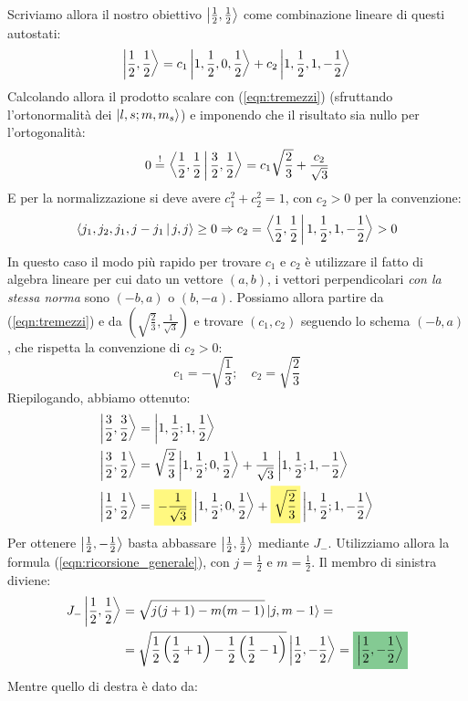 \documentclass[../../FisicaTeorica.tex]{subfiles}
\begin{document}
\begin{enumerate}
Scriviamo allora il nostro obiettivo $\Ket{\frac{1}{2},\frac{1}{2}}$ come combinazione lineare di questi autostati:
\[
\Ket{\frac{1}{2},\frac{1}{2}}=c_1\Ket{1,\frac{1}{2},0,\frac{1}{2}}+c_2\Ket{1,\frac{1}{2},1,-\frac{1}{2}}
\]
Calcolando allora il prodotto scalare con (\ref{eqn:tremezzi}) (sfruttando l'ortonormalità dei $\Ket{l,s;m,m_s}$) e imponendo che il risultato sia nullo per l'ortogonalità:
\begin{align*}
0 \overset{!}{=} \Braket{\frac{1}{2},\frac{1}{2}|\frac{3}{2},\frac{1}{2}}
= c_1 \sqrt{\frac{2}{3}}+\frac{c_2}{\sqrt{3}}
\end{align*}
E per la normalizzazione si deve avere $c_1^2 + c_2^2 =1$, con $c_2>0$ per la convenzione:
\[
\Braket{j_1, j_2, j_1, j-j_1 | j, j} \geq 0 \Rightarrow c_2 = \Braket{\frac{1}{2},\frac{1}{2}|1,\frac{1}{2},1,-\frac{1}{2}} > 0
\]
In questo caso il modo più rapido per trovare $c_1$ e $c_2$ è utilizzare il fatto di algebra lineare per cui dato un vettore $(a, b)$, i vettori perpendicolari \textit{con la stessa norma} sono $(-b, a)$ o $(b,-a)$. Possiamo allora partire da (\ref{eqn:tremezzi}) e da $(\sqrt{\frac{2}{3}},\frac{1}{\sqrt{3}})$ e trovare $(c_1, c_2)$ seguendo lo schema $(-b, a)$, che rispetta la convenzione di $c_2>0$:
\[
c_1 = -\sqrt{\frac{1}{3}}; \quad c_2 = \sqrt{\frac{2}{3}}
\]
Riepilogando, abbiamo ottenuto:
\begin{align}\nonumber
\ket{\frac{3}{2},\frac{3}{2}} &= \ket{1,\frac{1}{2};1,\frac{1}{2}}\\ \nonumber
\ket{\frac{3}{2},\frac{1}{2}} &= \sqrt{\frac{2}{3}}\ket{1,\frac{1}{2};0,\frac{1}{2}}+\frac{1}{\sqrt{3}}\ket{1,\frac{1}{2};1,-\frac{1}{2}}\\
\ket{\frac{1}{2},\frac{1}{2}} &= \hlc{Yellow}{-\frac{1}{\sqrt{3}}}\ket{1,\frac{1}{2};0,\frac{1}{2}}+\hlc{Yellow}{\sqrt{\frac{2}{3}}}\ket{1,\frac{1}{2};1,-\frac{1}{2}}
\label{eqn:unmezzo}
\end{align}
Per ottenere $\Ket{\frac{1}{2},-\frac{1}{2}}$ basta abbassare $\Ket{\frac{1}{2},\frac{1}{2}}$ mediante $J_-$. Utilizziamo allora la formula (\ref{eqn:ricorsione_generale}), con $j=\frac{1}{2}$ e $m=\frac{1}{2}$. Il membro di sinistra diviene: 
\begin{align*}
J_- \ket{\frac{1}{2},\frac{1}{2}}&= \sqrt{j(j+1)-m(m-1)}\ket{j,m-1}=\\
&=\sqrt{\frac{1}{2}\left(\frac{1}{2}+1\right)-\frac{1}{2}\left(\frac{1}{2}-1\right)} \ket{\frac{1}{2},-\frac{1}{2}}=\hlc{ForestGreen}{\ket{\frac{1}{2},-\frac{1}{2}}}
\end{align*}
Mentre quello di destra è dato da:

\end{enumerate}
\end{document}
